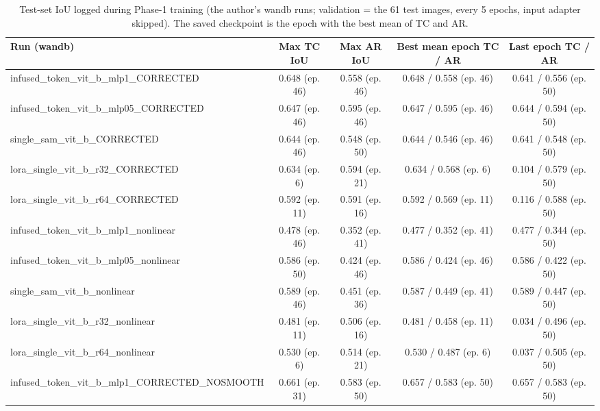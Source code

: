 \begin{table}[htbp]
\centering
\small
\begin{adjustbox}{max width=\linewidth}
\begin{tabular}{lcccc}
\toprule
Run (wandb) & Max TC IoU & Max AR IoU & Best mean epoch TC / AR & Last epoch TC / AR \\
\midrule
infused\_token\_vit\_b\_mlp1\_CORRECTED & 0.648 (ep. 46) & 0.558 (ep. 46) & 0.648 / 0.558 (ep. 46) & 0.641 / 0.556 (ep. 50) \\
infused\_token\_vit\_b\_mlp05\_CORRECTED & 0.647 (ep. 46) & 0.595 (ep. 46) & 0.647 / 0.595 (ep. 46) & 0.644 / 0.594 (ep. 50) \\
single\_sam\_vit\_b\_CORRECTED & 0.644 (ep. 46) & 0.548 (ep. 50) & 0.644 / 0.546 (ep. 46) & 0.641 / 0.548 (ep. 50) \\
lora\_single\_vit\_b\_r32\_CORRECTED & 0.634 (ep. 6) & 0.594 (ep. 21) & 0.634 / 0.568 (ep. 6) & 0.104 / 0.579 (ep. 50) \\
lora\_single\_vit\_b\_r64\_CORRECTED & 0.592 (ep. 11) & 0.591 (ep. 16) & 0.592 / 0.569 (ep. 11) & 0.116 / 0.588 (ep. 50) \\
infused\_token\_vit\_b\_mlp1\_nonlinear & 0.478 (ep. 46) & 0.352 (ep. 41) & 0.477 / 0.352 (ep. 41) & 0.477 / 0.344 (ep. 50) \\
infused\_token\_vit\_b\_mlp05\_nonlinear & 0.586 (ep. 50) & 0.424 (ep. 46) & 0.586 / 0.424 (ep. 46) & 0.586 / 0.422 (ep. 50) \\
single\_sam\_vit\_b\_nonlinear & 0.589 (ep. 46) & 0.451 (ep. 36) & 0.587 / 0.449 (ep. 41) & 0.589 / 0.447 (ep. 50) \\
lora\_single\_vit\_b\_r32\_nonlinear & 0.481 (ep. 11) & 0.506 (ep. 16) & 0.481 / 0.458 (ep. 11) & 0.034 / 0.496 (ep. 50) \\
lora\_single\_vit\_b\_r64\_nonlinear & 0.530 (ep. 6) & 0.514 (ep. 21) & 0.530 / 0.487 (ep. 6) & 0.037 / 0.505 (ep. 50) \\
infused\_token\_vit\_b\_mlp1\_CORRECTED\_NOSMOOTH & 0.661 (ep. 31) & 0.583 (ep. 50) & 0.657 / 0.583 (ep. 50) & 0.657 / 0.583 (ep. 50) \\
\bottomrule
\end{tabular}
\end{adjustbox}
\caption{Test-set IoU logged during Phase-1 training (the author's wandb runs; validation = the 61 test images, every 5 epochs, input adapter skipped). The saved checkpoint is the epoch with the best mean of TC and AR.}
\label{tab:thesis_recheck_training_logs}
\end{table}
